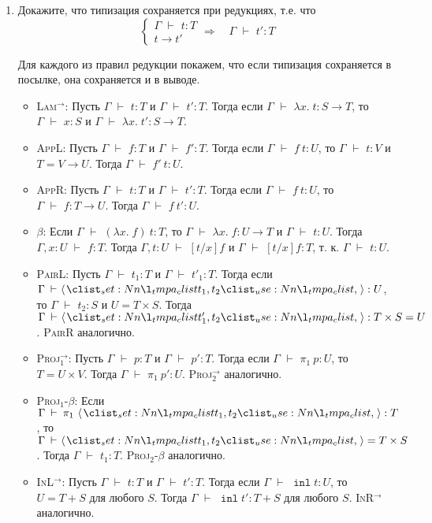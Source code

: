 \documentclass{article}
\DeclareMathOperator{\tinl}{\mathtt{inl}}
\DeclareMathOperator{\tstl}{\ \vdash\ }
\begin{document}
\begin{enumerate}
    \item Докажите, что типизация сохраняется при редукциях, т.е. что
    \[
        \begin{cases}
            \Gamma\tstl t:T\\
            t\to t'
        \end{cases}\Longrightarrow\quad\Gamma\tstl t':T
    \]

    \begin{mdframed}
        Для каждого из правил редукции покажем, что если типизация сохраняется в посылке, она сохраняется и в выводе.
        \begin{itemize}
            \item \textsc{Lam}$^\to$:  Пусть $\Gamma \tstl t:T$ и $\Gamma \tstl t':T$. Тогда если $\Gamma\tstl\lambda x.\;t: S\to T$, то $\Gamma\tstl x: S$ и $\Gamma\tstl \lambda x.\; t': S\to T$.
            \item \textsc{AppL}: Пусть $\Gamma\tstl f: T$ и $\Gamma\tstl f': T$. Тогда если $\Gamma\tstl f\ t: U$, то $\Gamma\tstl t: V$ и $T = V\to U$. Тогда $\Gamma\tstl f'\ t: U$.
            \item \textsc{AppR}: Пусть $\Gamma\tstl t: T$ и $\Gamma\tstl t': T$. Тогда если $\Gamma\tstl f\ t: U$, то $\Gamma\tstl f: T\to U$. Тогда $\Gamma\tstl f\ t': U$.
            \item \textsc{$\beta$}: Если $\Gamma\tstl (\lambda x.\; f)\ t: T$, то $\Gamma\tstl \lambda x.\; f: U\to T$ и $\Gamma\tstl t: U$. Тогда $\Gamma, x: U\tstl f: T$. Тогда $\Gamma, t: U\tstl [t/x]f$ и $\Gamma\tstl [t/x]f: T$, т. к. $\Gamma\tstl t:U$.
            \item \textsc{PairL}: Пусть $\Gamma\tstl t_1: T$ и $\Gamma\tstl t'_1: T$. Тогда если $\Gamma\tstl\opair{t_1, t_2}: U$, то $\Gamma\tstl t_2: S$ и $U = T \times S$. Тогда $\Gamma\tstl \opair{t_1', t_2}: T\times S = U$. \textsc{PairR} аналогично.
            \item \textsc{Proj$_1^\to$}: Пусть $\Gamma\tstl p: T$ и $\Gamma\tstl p': T$. Тогда если $\Gamma\tstl\pi_1\ p: U$, то $T = U \times V$. Тогда $\Gamma\tstl \pi_1\ p': U$. \textsc{Proj$_2^\to$} аналогично.
            \item \textsc{Proj$_1$-$\beta$}: Если $\Gamma\tstl\pi_1\ \opair{t_1, t_2}: T$, то $\Gamma\tstl \opair{t_1, t_2} = T\times S$. Тогда $\Gamma\tstl t_1: T$. \textsc{Proj$_2$-$\beta$} аналогично.
            \item \textsc{InL$^\to$}: Пусть $\Gamma\tstl t: T$ и $\Gamma\tstl t': T$. Тогда если $\Gamma\tstl\tinl t: U$, то $U = T + S$ для любого $S$. Тогда $\Gamma\tstl \tinl t': T + S$ для любого $S$. \textsc{InR$^\to$} аналогично.

\end{itemize}
\end{mdframed}
\end{enumerate}
\end{document}
